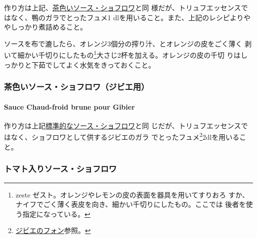 \begin{recette}
作り方は上記、\protect\hyperlink{sauce-chaud-froid-brune}{茶色いソース・ショフロワ}と同
様だが、トリュフエッセンスではなく、鴨のガラでとったフュメ1\undemi{}
dlを用いること。また、上記のレシピよりややしっかり煮詰めること。

ソースを布で漉したら、オレンジ3個分の搾り汁、とオレンジの皮をごく薄く
剥いて細かい千切りにしたもの\footnote{zeste
  ゼスト。オレンジやレモンの皮の表面を器具を用いてすりおろ
  すか、ナイフでごく薄く表皮を向き、細かい千切りにしたもの。ここでは
  後者を使う指定になっている。}大さじ2杯を加える。オレンジの皮の千切
りはしっかりと下茹でしてよく水気をきっておくこと。

\maeaki

\hypertarget{ux8336ux8272ux3044ux30bdux30fcux30b9ux30b7ux30e7ux30d5ux30edux30efux30b8ux30d3ux30a8ux7528}{%
\subsubsection{茶色いソース・ショフロワ（ジビエ用）}\label{ux8336ux8272ux3044ux30bdux30fcux30b9ux30b7ux30e7ux30d5ux30edux30efux30b8ux30d3ux30a8ux7528}}

\hypertarget{sauce-chaud-froid-brune-pour-gibier}{%
\paragraph{Sauce Chaud-froid brune pour
Gibier}\label{sauce-chaud-froid-brune-pour-gibier}}


作り方は上記\protect\hyperlink{sauce-chaud-froid-brune}{標準的なソース・ショフロワ}と同
じだが、トリュフエッセンスではなく、ショフロワとして供するジビエのガラ
でとったフュメ\footnote{\protect\hyperlink{fonds-de-gibier}{ジビエのフォン}参照。}2dlを用いること。

\maeaki

\hypertarget{ux30c8ux30deux30c8ux5165ux308aux30bdux30fcux30b9ux30b7ux30e7ux30d5ux30edux30ef}{%
\subsubsection{トマト入りソース・ショフロワ}\label{ux30c8ux30deux30c8ux5165ux308aux30bdux30fcux30b9ux30b7ux30e7ux30d5ux30edux30ef}}


\end{recette}
